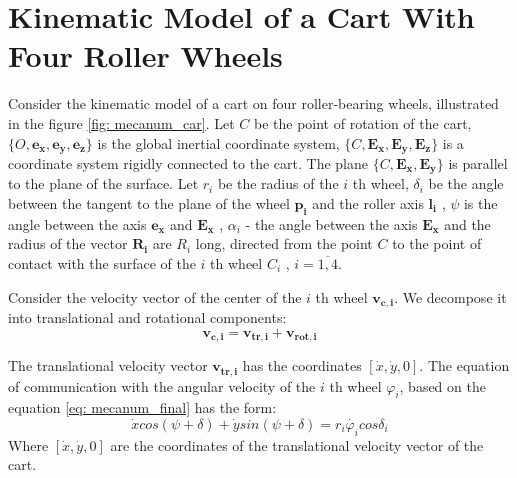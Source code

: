 \documentclass[oneside,final,14pt]{extreport}
\newcommand{\cmmnt}[1]{\ignorespaces}
\newcommand{\bs}{\boldsymbol}
\begin{document}
\chapter{Kinematic Model of a Cart With Four Roller Wheels}
Consider the kinematic model of a cart on four roller-bearing wheels, illustrated in the figure \ref{fig: mecanum_car}. Let $ C $ be the point of rotation of the cart, $ \{O, \bs{e_{x}}, \bs{e_{y}}, \bs{e_{z}} \} $ is the global inertial coordinate system, $ \{C, \bs{E_{x}}, \bs{E_{y}}, \bs{E_{z}} \} $ is a coordinate system rigidly connected to the cart. The plane $ \{C, \bs{E_{x}}, \bs{E_{y}} \} $ is parallel to the plane of the surface. Let $ r_{i} $ be the radius of the $ i $ th wheel, $ \delta_{i} $ be the angle between the tangent to the plane of the wheel $ \bs{p_{i}} $ and the roller axis $ \bs{l_{i }} $ \cmmnt{, $ \delta_{i} = \widehat{p_{i} l_{i}} $}, $ \psi $ is the angle between the axis $ \bs{e_{x}} $ and $ \bs{E_{x}} $ \cmmnt{, $ \psi $ = $ \widehat{e_{x} E{x}} $}, $ \alpha_{i} $ - the angle between the axis $ \bs{E_{ x}} $ and the radius of the vector $ \bs{R_{i}} $ are $ R_{i} $ long, directed from the point $ C $ to the point of contact with the surface of the $ i $ th wheel $ C_{i} $ \cmmnt{, $ \alpha_{i} = \widehat{E_{x} \overrightarrow{C C_{i}}} $}, $ i = \overline{1,4} $.

\begin{figure} [H]
\end{figure}

Consider the velocity vector of the center of the $ i $ th wheel $ \bs{v_{c, i}} $. We decompose it into translational and rotational components:
\begin{equation}
\label{eq: mec_wheel_v_decomp}
\bs{v_{c, i}}
=
\bs{v_{tr, i}}
+
\bs{v_{rot, i}}
\end{equation}

The translational velocity vector $ \bs{v_{tr, i}} $ has the coordinates $ [\dot{x}, \dot{y}, 0] $. The equation of communication with the angular velocity of the $ i $ th wheel $ \varphi_{i} $, based on the equation \ref{eq: mecanum_final} has the form:
\begin{equation}
\dot{x}
cos (\psi + \delta)
+
\dot{y}
sin (\psi + \delta)
=
r_{i} \dot{\varphi_{i}}
cos \delta_{i}
\end{equation}
Where $ [\dot{x}, \dot{y}, 0] $ are the coordinates of the translational velocity vector of the cart.
\end{document}
